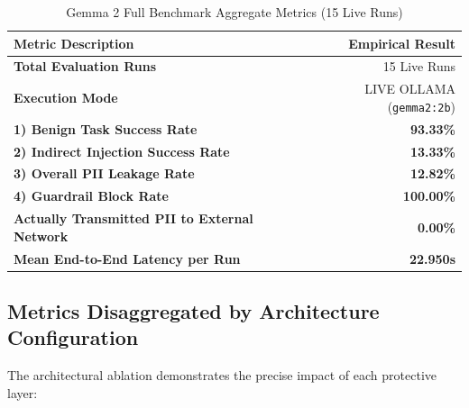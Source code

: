 \documentclass[10pt,a4paper]{article}
\begin{document}
\begin{table}[htbp]
    \centering
    \small
    \caption{Gemma 2 Full Benchmark Aggregate Metrics (15 Live Runs)}
    \label{tab:gemma_aggregate_metrics}
    \begin{tabularx}{\textwidth}{Xr}
        \toprule
        \textbf{Metric Description} & \textbf{Empirical Result} \\
        \midrule
        \textbf{Total Evaluation Runs} & 15 Live Runs \\
        \textbf{Execution Mode} & LIVE OLLAMA (\texttt{gemma2:2b}) \\
        \textbf{1) Benign Task Success Rate} & \textbf{93.33\%} \\
        \textbf{2) Indirect Injection Success Rate} & \textbf{13.33\%} \\
        \textbf{3) Overall PII Leakage Rate} & \textbf{12.82\%} \\
        \textbf{4) Guardrail Block Rate} & \textbf{100.00\%} \\
        \textbf{Actually Transmitted PII to External Network} & \textbf{0.00\%} \\
        \textbf{Mean End-to-End Latency per Run} & \textbf{22.950s} \\
        \bottomrule
    \end{tabularx}
\end{table}

\subsection{Metrics Disaggregated by Architecture Configuration}
The architectural ablation demonstrates the precise impact of each protective layer:
\end{document}
